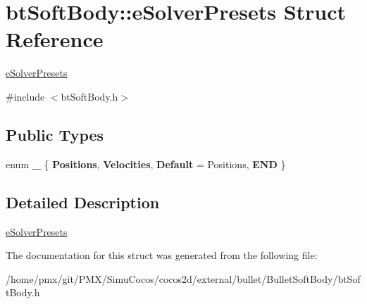 \hypertarget{structbtSoftBody_1_1eSolverPresets}{}\section{bt\+Soft\+Body\+:\+:e\+Solver\+Presets Struct Reference}
\label{structbtSoftBody_1_1eSolverPresets}


\hyperlink{structbtSoftBody_1_1eSolverPresets}{e\+Solver\+Presets}  




{\ttfamily \#include $<$bt\+Soft\+Body.\+h$>$}

\subsection*{Public Types}
\begin{DoxyCompactItemize}
\item 
\mbox{\label{structbtSoftBody_1_1eSolverPresets_aca9f468831b5ac0c35998d8202caf049}} 
enum {\bfseries \+\_\+} \{ {\bfseries Positions}, 
{\bfseries Velocities}, 
{\bfseries Default} = Positions, 
{\bfseries E\+ND}
 \}
\end{DoxyCompactItemize}


\subsection{Detailed Description}
\hyperlink{structbtSoftBody_1_1eSolverPresets}{e\+Solver\+Presets} 

The documentation for this struct was generated from the following file\+:\begin{DoxyCompactItemize}
\item 
/home/pmx/git/\+P\+M\+X/\+Simu\+Cocos/cocos2d/external/bullet/\+Bullet\+Soft\+Body/bt\+Soft\+Body.\+h\end{DoxyCompactItemize}
